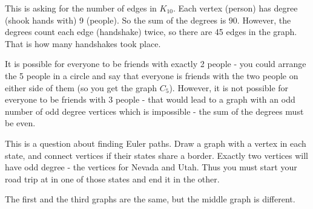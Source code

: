 \documentclass[11pt]{exam}
\newcommand{\vtx}[2]{node[fill,circle,inner sep=0pt, minimum size=7pt,label=#1:#2]{}}
\renewcommand{\v}{\vtx{above}{}}
\begin{document}
 

\begin{questions}

\question This is asking for the number of edges in $K_{10}$.  Each vertex (person) has degree (shook hands with) 9 (people).  So the sum of the degrees is $90$.  However, the degrees count each edge (handshake) twice, so there are 45 edges in the graph.  That is how many handshakes took place.%

\question It is possible for everyone to be friends with exactly 2 people - you could arrange the 5 people in a circle and say that everyone is friends with the two people on either side of them (so you get the graph $C_5$).  However, it is not possible for everyone to be friends with 3 people - that would lead to a graph with an odd number of odd degree vertices which is impossible - the sum of the degrees must be even.  %

\question This is a question about finding Euler paths.  Draw a graph with a vertex in each state, and connect vertices if their states share a border.  Exactly two vertices will have odd degree - the vertices for Nevada and Utah.  Thus you must start your road trip at in one of those states and end it in the other. %


\question The first and the third graphs are the same, but the middle graph is different. %

% 
% 


\end{questions}
\end{document}
